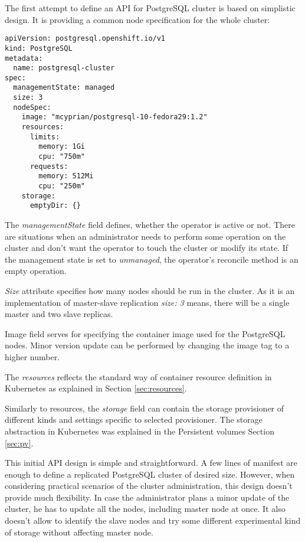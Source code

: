 \documentclass[
  digital, %
  twoside, %
  table,   %
  nolof,   %
  nolot,   %
]{fithesis3}
\begin{document}
The first attempt to define an API for PostgreSQL cluster is based on simplistic design. It is providing a common node specification for the whole cluster:

\begin{lstlisting}
apiVersion: postgresql.openshift.io/v1
kind: PostgreSQL
metadata:
  name: postgresql-cluster
spec:
  managementState: managed
  size: 3
  nodeSpec:
    image: "mcyprian/postgresql-10-fedora29:1.2"
    resources:
      limits:
        memory: 1Gi
        cpu: "750m"
      requests:
        memory: 512Mi
        cpu: "250m"
    storage:
      emptyDir: {}
\end{lstlisting}

The \textit{managementState} field defines, whether the operator is active or not. There are situations when an administrator needs to perform some operation on the cluster and don't want the operator to touch the cluster or modify its state. If the management state is set to \textit{unmanaged}, the operator’s reconcile method is an empty operation.

\textit{Size} attribute specifies how many nodes should be run in the cluster. As it is an implementation of master-slave replication \textit{size: 3} means, there will be a single master and two slave replicas.

Image field serves for specifying the container image used for the PostgreSQL nodes. Minor version update can be performed by changing the image tag to a higher number.

The \textit{resources} reflects the standard way of container resource definition in Kubernetes as explained in Section \ref{sec:resources}.

Similarly to resources, the \textit{storage} field can contain the storage provisioner of different kinds and settings specific to selected provisioner. The storage abstraction in Kubernetes was explained in the Persistent volumes Section \ref{sec:pv}.

This initial API design is simple and straightforward. A few lines of manifest are enough to define a replicated PostgreSQL cluster of desired size. However, when considering practical scenarios of the cluster administration, this design doesn't provide much flexibility. In case the administrator plans a minor update of the cluster, he has to update all the nodes, including master node at once. It also doesn't allow to identify the slave nodes and try some different experimental kind of storage without affecting master node.
\end{document}
